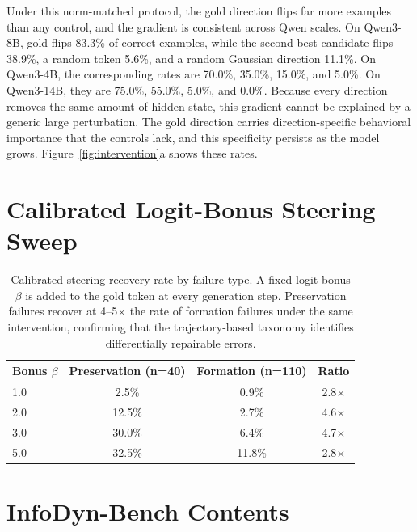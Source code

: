 \documentclass{article} %
\begin{document}
Under this norm-matched protocol, the gold direction flips far more examples than any control, and the gradient is consistent across Qwen scales. On Qwen3-8B, gold flips 83.3\% of correct examples, while the second-best candidate flips 38.9\%, a random token 5.6\%, and a random Gaussian direction 11.1\%. On Qwen3-4B, the corresponding rates are 70.0\%, 35.0\%, 15.0\%, and 5.0\%. On Qwen3-14B, they are 75.0\%, 55.0\%, 5.0\%, and 0.0\%. Because every direction removes the same amount of hidden state, this gradient cannot be explained by a generic large perturbation. The gold direction carries direction-specific behavioral importance that the controls lack, and this specificity persists as the model grows. Figure~\ref{fig:intervention}a shows these rates.

\section{Calibrated Logit-Bonus Steering Sweep}
\label{app:steering}

\begin{table}[h]
\centering
\caption{Calibrated steering recovery rate by failure type. A fixed logit bonus $\beta$ is added to the gold token at every generation step. Preservation failures recover at 4--5$\times$ the rate of formation failures under the same intervention, confirming that the trajectory-based taxonomy identifies differentially repairable errors.}
\label{tab:steering}
\begin{tabular}{lccc}
\toprule
\textbf{Bonus $\beta$} & \textbf{Preservation (n=40)} & \textbf{Formation (n=110)} & \textbf{Ratio} \\
\midrule
1.0 & 2.5\% & 0.9\% & 2.8$\times$ \\
2.0 & 12.5\% & 2.7\% & 4.6$\times$ \\
3.0 & 30.0\% & 6.4\% & 4.7$\times$ \\
5.0 & 32.5\% & 11.8\% & 2.8$\times$ \\
\bottomrule
\end{tabular}
\end{table}

\section{InfoDyn-Bench Contents}
\label{app:bench}
\end{document}
